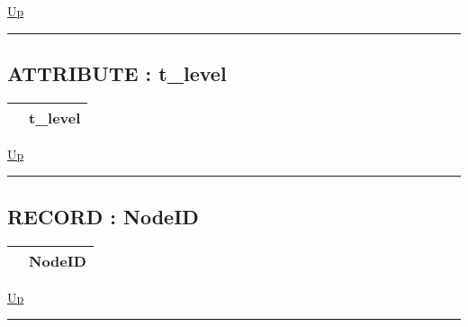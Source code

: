 \hyperlink{ecldoc:ML_Core.Types}{Up}

\par


\rule{\textwidth}{0.4pt}
\subsection*{ATTRIBUTE : t\_level}
\hypertarget{ecldoc:ml_core.types.t_level}{}

{\renewcommand{\arraystretch}{1.5}
\begin{tabularx}{\textwidth}{|>{\raggedright\arraybackslash}l|X|}
\hline
\hspace{0pt} & t\_level \\
\hline
\end{tabularx}
}

\hyperlink{ecldoc:ML_Core.Types}{Up}

\par


\rule{\textwidth}{0.4pt}
\subsection*{RECORD : NodeID}
\hypertarget{ecldoc:ml_core.types.nodeid}{}

{\renewcommand{\arraystretch}{1.5}
\begin{tabularx}{\textwidth}{|>{\raggedright\arraybackslash}l|X|}
\hline
\hspace{0pt} & NodeID \\
\hline
\end{tabularx}
}

\hyperlink{ecldoc:ML_Core.Types}{Up}

\par


\rule{\textwidth}{0.4pt}


